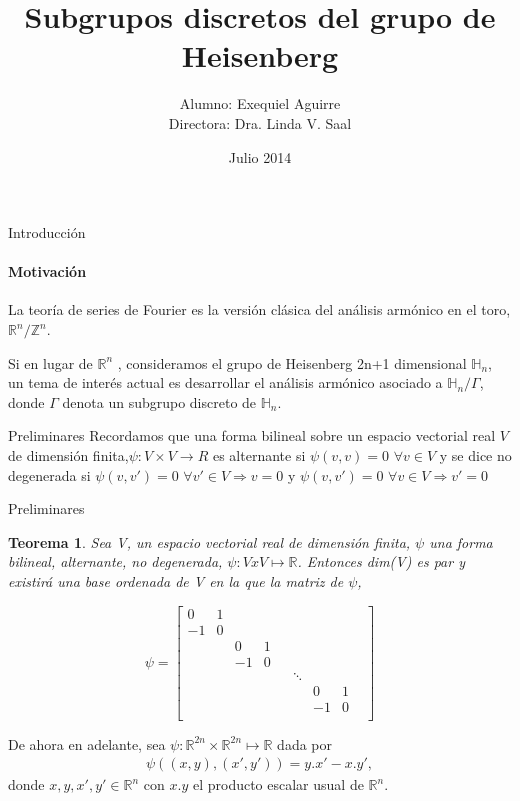 \documentclass{beamer}
\author{Alumno: Exequiel Aguirre \\ Directora: Dra. Linda V. Saal}
\title{Subgrupos discretos del grupo de Heisenberg }
\date{Julio 2014}
\newtheorem{teorema}{Teorema}
\begin{document}
\maketitle


\begin{frame}{Introducción}
\framesubtitle{Motivación}
La teoría de series de Fourier es la versión clásica del análisis armónico en el toro,
$\mathbb{R}^n /\mathbb{Z}^n$.

Si en lugar de $\mathbb{R}^n$ , consideramos el grupo de Heisenberg 2n+1 dimensional $\mathbb{H}_n$, un tema
de interés actual es desarrollar el análisis armónico asociado a $\mathbb{H}_n/\Gamma$, donde $\Gamma$ 
denota un subgrupo discreto de $\mathbb{H}_n$. 
\end{frame}


\begin{frame}{Preliminares}
Recordamos que una forma bilineal sobre un espacio vectorial real $V$ de dimensión finita,$\psi :V\times V\rightarrow R$
es alternante si $\psi(v,v)=0$ $\forall v \in V$  y se dice no degenerada si 
$\psi(v,v')=0$ $\forall v' \in V \Rightarrow v = 0$  y 
$\psi(v,v')=0$ $\forall v \in V \Rightarrow v' = 0$
\end{frame}

\begin{frame}{Preliminares}
\begin{teorema} \label{Lang-8.1}
 Sea V, un espacio vectorial real de dimensión finita, $\psi$ una forma bilineal, alternante, no degenerada, 
 $\psi:VxV\mapsto \mathbb{R}$. Entonces dim(V) es par y existirá una base ordenada de V en la que la matriz de $\psi$,
 
$$\psi = 
\begin{bmatrix}
 0 & 1 & & & & & & &\\ 
 -1& 0 & & & & & & &\\
 & & 0 & 1 & & & & &\\
 & & -1 & 0 & & & & &\\
 & &  &  & & \ddots & & &\\
 & &  &  & & & 0 & 1 &\\
 & &  &  & & & -1 & 0 &\\ 
\end{bmatrix}
$$
\end{teorema}

De ahora en adelante, sea $\psi :\mathbb{R}^{2n} \times \mathbb{R}^{2n}\mapsto \mathbb{R}$ dada por 
$$ \begin{aligned}
\psi((x,y),(x',y'))=y.x'-x.y' ,
\end{aligned}$$
donde $x,y,x',y' \in \mathbb{R}^n$ con  $x.y$ el producto escalar usual de $\mathbb{R}^n$.
\end{frame}
\end{document}
